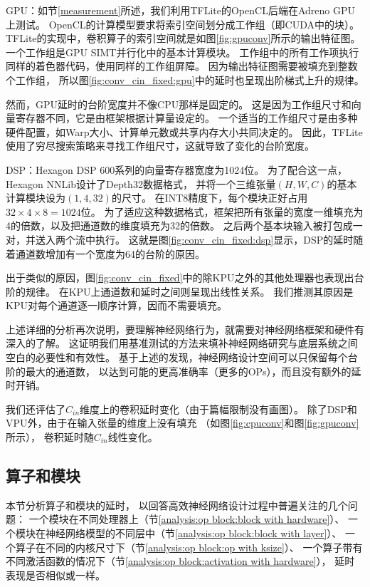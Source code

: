 GPU：如节\ref{measurement}所述，我们利用TFLite的OpenCL后端在Adreno GPU上测试。
OpenCL的计算模型要求将索引空间划分成工作组（即CUDA中的块）\cite{lee2019device}。
TFLite的实现中，卷积算子的索引空间就是如图\ref{fig:gpuconv}所示的输出特征图。
一个工作组是GPU SIMT并行化中的基本计算模块。
工作组中的所有工作项执行同样的着色器代码，使用同样的工作组屏障。
因为输出特征图需要被填充到整数个工作组，
所以图\ref{fig:conv_cin_fixed:gpu}中的延时也呈现出阶梯式上升的规律。

然而，GPU延时的台阶宽度并不像CPU那样是固定的。
这是因为工作组尺寸和向量寄存器不同，它是由框架根据计算量设定的。
一个适当的工作组尺寸是由多种硬件配置，如Warp大小、计算单元数或共享内存大小共同决定的。
因此，TFLite使用了穷尽搜索策略来寻找工作组尺寸，这就导致了变化的台阶宽度。

DSP：Hexagon DSP 600系列的向量寄存器宽度为1024位。
为了配合这一点，Hexagon NNLib设计了Depth32\cite{nnlib}数据格式，
并将一个三维张量$(H,W,C)$的基本计算模块设为$(1,4,32)$的尺寸。
在INT8精度下，每个模块正好占用$32\times 4\times 8=1024$位。
为了适应这种数据格式，框架把所有张量的宽度一维填充为4的倍数，以及把通道数的维度填充为32的倍数。
之后两个基本块输入被打包成一对，并送入两个流中执行。
这就是图\ref{fig:conv_cin_fixed:dsp}显示，DSP的延时随着通道数增加有一个宽度为64的台阶的原因。

出于类似的原因，图\ref{fig:conv_cin_fixed}中的除KPU之外的其他处理器也表现出台阶的规律。
在KPU上通道数和延时之间则呈现出线性关系。
我们推测其原因是KPU对每个通道逐一顺序计算，因而不需要填充。

上述详细的分析再次说明，要理解神经网络行为，就需要对神经网络框架和硬件有深入的了解。
这证明我们用基准测试的方法来填补神经网络研究与底层系统之间空白的必要性和有效性。
基于上述的发现，神经网络设计空间可以只保留每个台阶的最大的通道数，
以达到可能的更高准确率（更多的OPs），而且没有额外的延时开销。

我们还评估了$C_{in}$维度上的卷积延时变化（由于篇幅限制没有画图）。
除了DSP和VPU外，由于在输入张量的维度上没有填充
（如图\ref{fig:cpuconv}和图\ref{fig:gpuconv}所示），
卷积延时随$C_{in}$线性变化。

\subsection{算子和模块}
\label{analysis:op block}
本节分析算子和模块的延时，
以回答高效神经网络设计过程中普遍关注的几个问题：
一个模块在不同处理器上（节\ref{analysis:op block:block with hardware}）、
一个模块在神经网络模型的不同层中（节\ref{analysis:op block:block with layer}）、
一个算子在不同的内核尺寸下（节\ref{analysis:op block:op with ksize}）、
一个算子带有不同激活函数的情况下（节\ref{analysis:op block:activation with hardware}），
延时表现是否相似或一样。

